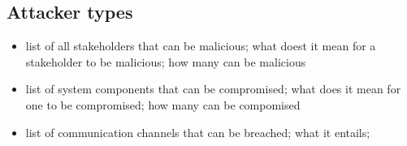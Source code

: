 \subsection{Attacker types} \label{sec: attacker types}

\begin{itemize}
    \item list of all stakeholders that can be malicious; what doest it mean for a stakeholder to be malicious; how many can be malicious
    \item list of system components that can be compromised; what does it mean for one to be compromised; how many can be compomised
    \item list of communication channels that can be breached; what it entails; 
\end{itemize}
